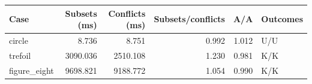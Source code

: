\begin{tabular}{lrrrrl}
\toprule
Case & Subsets (ms) & Conflicts (ms) & Subsets/conflicts & A/A & Outcomes \\
\midrule
circle & 8.736 & 8.751 & 0.992 & 1.012 & U/U \\
trefoil & 3090.036 & 2510.108 & 1.230 & 0.981 & K/K \\
figure\_eight & 9698.821 & 9188.772 & 1.054 & 0.990 & K/K \\
\bottomrule
\end{tabular}
